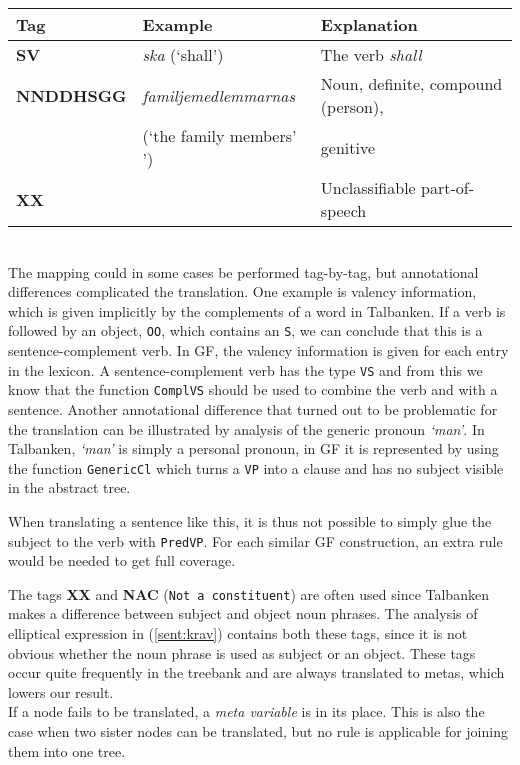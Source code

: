 \documentclass[runningheads,a4paper]{llncs}
\begin{document}
\begin{tabular}{lll}
\textbf{Tag} & \textbf{Example} & \textbf{Explanation} \\
\hline
\textbf{SV} & \emph{ska} (`shall') & The verb \emph{shall}\\
\textbf{NNDDHSGG} & \emph{familjemedlemmarnas} & Noun, definite, compound (person),\\
&(`the family members' ') &genitive \\
\textbf{XX} & & Unclassifiable part-of-speech\\
\end{tabular}\\

The mapping could in some cases be performed tag-by-tag, but annotational
differences complicated the translation.
One example is valency information, which is given implicitly by the complements
of a word in Talbanken. If a verb is followed by an object, \verb-OO-, which contains an
\verb-S-, we can conclude that this is a sentence-complement verb.
In GF, the valency information is given for each entry in the lexicon.
A sentence-complement verb has the type \verb-VS- and from this we know 
that the function \verb-ComplVS- should be used to combine the verb and with a 
sentence.
Another annotational difference that turned out to be problematic for the
translation can be illustrated by analysis of the generic pronoun \emph{`man'}.
In Talbanken, \emph{`man'} is simply a personal pronoun, 
in GF it is represented by using the function \verb|GenericCl| which turns a
\verb-VP- into a clause and has no subject visible in the abstract tree. 

When translating a sentence like this, it is thus not possible to simply glue the
subject to the verb with \verb|PredVP|. For each similar GF construction, an extra rule
would be needed to get full coverage. 

The tags \textbf{XX} and \textbf{NAC} (\verb-Not a constituent-) are often used since Talbanken makes a
difference between subject
and object noun phrases.
The analysis of elliptical expression in (\ref{sent:krav})
\label{sent:krav}
contains both these tags, since it is not obvious
whether the noun phrase is used as subject or an object.
These tags occur quite frequently in the treebank and are always translated
to metas, which lowers our result. \\

If a node fails to be translated, a \textit{meta variable} is in its place. This is also the
case when two sister nodes can be translated, but no rule is applicable for joining them
into one tree.
\end{document}
